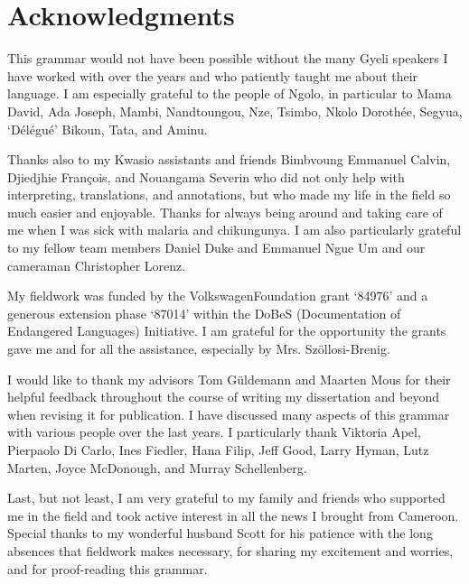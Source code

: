 \chapter*{\center Acknowledgments}
\label{sec:acknowledgments}

This grammar would not have been possible without the many Gyeli speakers I have worked with over the years and who patiently taught me about their language. I am especially grateful to the people of Ngolo, in particular to Mama David, Ada Joseph, Mambi, Nandtoungou, Nze, Tsimbo, Nkolo Dorothée, Segyua, `Délégué' Bikoun, Tata, and Aminu.

Thanks also to my Kwasio assistants and friends Bimbvoung Emmanuel Calvin, Djiedjhie François, and Nouangama Severin who did not only help with interpreting, translations, and annotations, but who made my life in the field so much easier and enjoyable. Thanks for always being around and taking care of me when I was sick with malaria and chikungunya.
I am also particularly grateful to my fellow team members Daniel Duke and Emmanuel Ngue Um and our cameraman Christopher Lorenz.

My fieldwork was funded by the VolkswagenFoundation grant `84976' and a generous extension phase `87014'  within the DoBeS (Documentation of Endangered Languages) Initiative. I am grateful for the opportunity the grants gave me and for all the assistance, especially by Mrs. Szöllosi-Brenig.

I would like to thank my advisors Tom Güldemann and Maarten Mous for their helpful feedback throughout the course of writing my dissertation and beyond when revising it for publication.  I have discussed many aspects of this grammar with various people over the last years. I particularly thank Viktoria Apel, Pierpaolo Di Carlo, Ines Fiedler, Hana Filip, Jeff Good, Larry Hyman, Lutz Marten, Joyce McDonough, and Murray Schellenberg.

Last, but not least, I am very grateful to my family and friends 
who supported me in the field and took active interest in all the news I brought from Cameroon. Special thanks to my wonderful husband Scott for his patience with the long absences that fieldwork makes necessary, for sharing my excitement and worries, and for proof-reading this grammar.